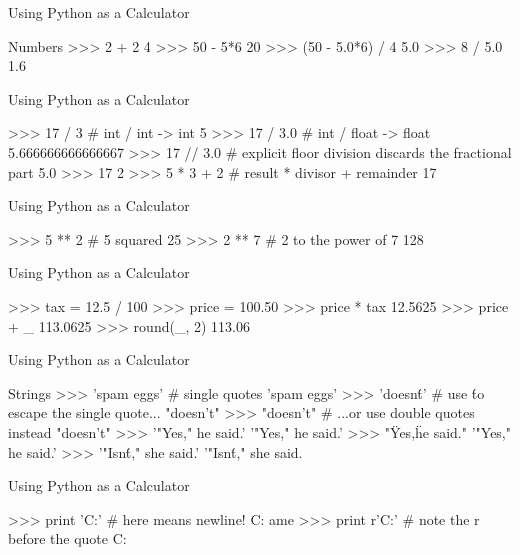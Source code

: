 \documentclass[11pt]{beamer}
\begin{document}
\begin{frame}[containsverbatim]{Using Python as a Calculator}
\begin{python}
Numbers
>>> 2 + 2
4
>>> 50 - 5*6
20
>>> (50 - 5.0*6) / 4
5.0
>>> 8 / 5.0
1.6
\end{python}
\end{frame}


\begin{frame}[containsverbatim]{Using Python as a Calculator}
\begin{python}
>>> 17 / 3  # int / int -> int
5
>>> 17 / 3.0  # int / float -> float
5.666666666666667
>>> 17 // 3.0  # explicit floor division discards the fractional part
5.0
>>> 17 %
2
>>> 5 * 3 + 2  # result * divisor + remainder
17
\end{python}
\end{frame}


\begin{frame}[containsverbatim]{Using Python as a Calculator}
\begin{python}
>>> 5 ** 2  # 5 squared
25
>>> 2 ** 7  # 2 to the power of 7
128
\end{python}
\end{frame}


\begin{frame}[containsverbatim]{Using Python as a Calculator}
\begin{python}
>>> tax = 12.5 / 100
>>> price = 100.50
>>> price * tax
12.5625
>>> price + _
113.0625
>>> round(_, 2)
113.06
\end{python}
\end{frame}


\begin{frame}[containsverbatim]{Using Python as a Calculator}
\begin{python}
Strings
>>> 'spam eggs'  # single quotes
'spam eggs'
>>> 'doesn\'t'  # use \' to escape the single quote...
"doesn't"
>>> "doesn't"  # ...or use double quotes instead
"doesn't"
>>> '"Yes," he said.'
'"Yes," he said.'
>>> "\"Yes,\" he said."
'"Yes," he said.'
>>> '"Isn\'t," she said.'
'"Isn\'t," she said.
\end{python}
\end{frame}


\begin{frame}[containsverbatim]{Using Python as a Calculator}
\begin{python}
>>> print 'C:\some\name'  # here \n means newline!
C:\some
ame
>>> print r'C:\some\name'  # note the r before the quote
C:\some\name
\end{python}
\end{frame}
\end{document}
